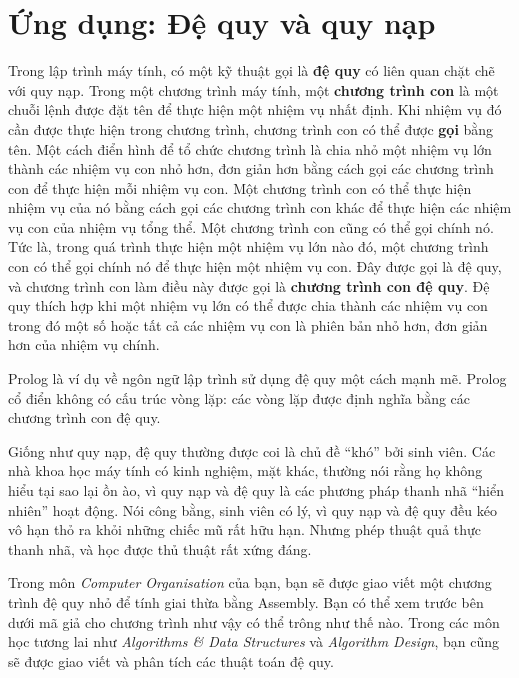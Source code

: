 \section{Ứng dụng: Đệ quy và quy nạp}

Trong lập trình máy tính, có một kỹ thuật gọi là \textbf{đệ quy} có liên quan chặt chẽ với quy nạp. Trong một chương trình máy tính, một \textbf{chương trình con} là một chuỗi lệnh được đặt tên để thực hiện một nhiệm vụ nhất định. Khi nhiệm vụ đó cần được thực hiện trong chương trình, chương trình con có thể được \textbf{gọi} bằng tên. Một cách điển hình để tổ chức chương trình là chia nhỏ một nhiệm vụ lớn thành các nhiệm vụ con nhỏ hơn, đơn giản hơn bằng cách gọi các chương trình con để thực hiện mỗi nhiệm vụ con. Một chương trình con có thể thực hiện nhiệm vụ của nó bằng cách gọi các chương trình con khác để thực hiện các nhiệm vụ con của nhiệm vụ tổng thể. Một chương trình con cũng có thể gọi chính nó. Tức là, trong quá trình thực hiện một nhiệm vụ lớn nào đó, một chương trình con có thể gọi chính nó để thực hiện một nhiệm vụ con. Đây được gọi là đệ quy, và chương trình con làm điều này được gọi là \textbf{chương trình con đệ quy}. Đệ quy thích hợp khi một nhiệm vụ lớn có thể được chia thành các nhiệm vụ con trong đó một số hoặc tất cả các nhiệm vụ con là phiên bản nhỏ hơn, đơn giản hơn của nhiệm vụ chính.

\begin{notebox}
Prolog là ví dụ về ngôn ngữ lập trình sử dụng đệ quy một cách mạnh mẽ. Prolog cổ điển không có cấu trúc vòng lặp: các vòng lặp được định nghĩa bằng các chương trình con đệ quy.
\end{notebox}

Giống như quy nạp, đệ quy thường được coi là chủ đề ``khó'' bởi sinh viên. Các nhà khoa học máy tính có kinh nghiệm, mặt khác, thường nói rằng họ không hiểu tại sao lại ồn ào, vì quy nạp và đệ quy là các phương pháp thanh nhã ``hiển nhiên'' hoạt động. Nói công bằng, sinh viên có lý, vì quy nạp và đệ quy đều kéo vô hạn thỏ ra khỏi những chiếc mũ rất hữu hạn. Nhưng phép thuật quả thực thanh nhã, và học được thủ thuật rất xứng đáng.

\begin{notebox}
Trong môn \emph{Computer Organisation} của bạn, bạn sẽ được giao viết một chương trình đệ quy nhỏ để tính giai thừa bằng Assembly. Bạn có thể xem trước bên dưới mã giả cho chương trình như vậy có thể trông như thế nào. Trong các môn học tương lai như \emph{Algorithms \& Data Structures} và \emph{Algorithm Design}, bạn cũng sẽ được giao viết và phân tích các thuật toán đệ quy.
\end{notebox}

